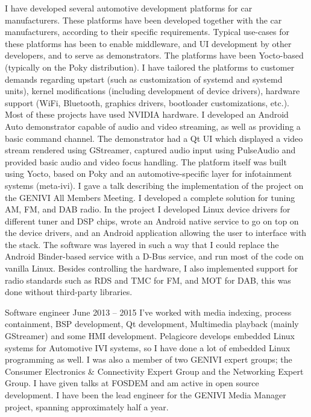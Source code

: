 \documentclass{twocolcv}
\begin{document}
           {
        {I have developed several automotive development platforms for car manufacturers. These platforms have been developed together with the car manufacturers, according to their specific requirements. Typical use-cases for these platforms has been to enable middleware, and UI development by other developers, and to serve as demonstrators. The platforms have been Yocto-based (typically on the Poky distribution). I have tailored the platforms to customer demands regarding upstart (such as customization of systemd and systemd units), kernel modifications (including development of device drivers), hardware support (WiFi, Bluetooth, graphics drivers, bootloader customizations, etc.). Most of these projects have used NVIDIA hardware.}
\newline\newline
{}
        {I developed an Android Auto demonstrator capable of audio and video streaming, as well as providing a basic command channel. The demonstrator had a Qt UI which displayed a video stream rendered using GStreamer, captured audio input using PulseAudio and provided basic audio and video focus handling. The platform itself was built using Yocto, based on Poky and an automotive-specific layer for infotainment systems (meta-ivi). I gave a talk describing the implementation of the project on the GENIVI All Members Meeting.}
\newline\newline
{}
        {I developed a complete solution for tuning AM, FM, and DAB radio. In the project I developed Linux device drivers for different tuner and DSP chips, wrote an Android native service to go on top on the device drivers, and an Android application allowing the user to interface with the stack. The software was layered in such a way that I could replace the Android Binder-based service with a D-Bus service, and run most of the code on vanilla Linux. Besides controlling the hardware, I also implemented support for radio standards such as RDS and TMC for FM, and MOT for DAB, this was done without third-party libraries.}
}

     {Software engineer}
     {June 2013 -- 2015}
     {I've worked with media indexing, process containment, BSP development, Qt development, Multimedia playback (mainly GStreamer) and some HMI development. Pelagicore develops embedded Linux systems for Automotive IVI systems, so I have done a lot of embedded Linux programming as well. I was also a member of two GENIVI expert groups; the Consumer Electronics \& Connectivity Expert Group and the Networking Expert Group. I have given talks at FOSDEM and am active in open source development. I have been the lead engineer for the GENIVI Media Manager project, spanning approximately half a year.}
\end{document}
